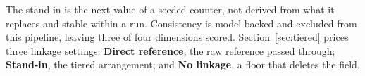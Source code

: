 The stand-in is the next value of a seeded counter, not derived from what it replaces and stable
within a run. Consistency is model-backed and excluded from this pipeline, leaving three of four
dimensions scored. Section~\ref{sec:tiered} prices three linkage settings: \textbf{Direct reference},
the raw reference passed through; \textbf{Stand-in}, the tiered arrangement; and \textbf{No linkage},
a floor that deletes the field.
